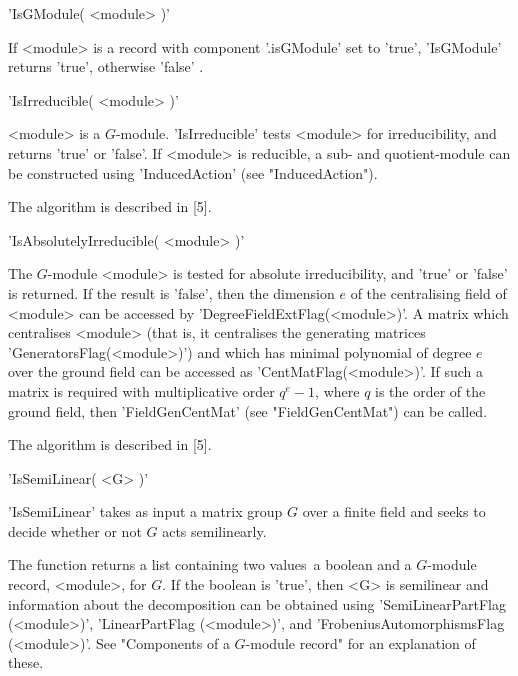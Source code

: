 
'IsGModule( <module> )'

If <module> is  a   record with  component  '.isGModule' set   to 'true',
'IsGModule' returns 'true', otherwise 'false' .



'IsIrreducible( <module> )'

<module>    is   a   $G$-module.   'IsIrreducible'     tests <module> for
irreducibility, and returns 'true' or 'false'.  If <module> is reducible,
a sub- and quotient-module can be  constructed using 'InducedAction' (see
"InducedAction").

The algorithm is described in [5].


'IsAbsolutelyIrreducible( <module> )'

The $G$-module <module> is tested for absolute irreducibility, and 'true'
or 'false' is returned. If the result is  'false', then the dimension $e$
of     the  centralising  field   of  <module>    can    be   accessed by
'DegreeFieldExtFlag(<module>)'.    A  matrix which  centralises  <module>
(that       is,     it       centralises      the     generating matrices
'GeneratorsFlag(<module>)')  and  which has minimal polynomial  of degree
$e$ over the ground field can be accessed as 'CentMatFlag(<module>)'.  If
such a matrix is required with multiplicative order $q^e-1$, where $q$ is
the order     of   the  ground    field,  then    'FieldGenCentMat'  (see
"FieldGenCentMat") can be called.

The algorithm is described in [5].


'IsSemiLinear( <G> )' 

'IsSemiLinear' takes as input a matrix group $G$  over a finite field and
seeks to decide whether or not $G$ acts semilinearly.

The  function  returns a list containing  two  values\:\ a boolean  and a
$G$-module record, <module>, for $G$.  If the boolean is 'true', then <G>
is semilinear  and information  about  the decomposition can  be obtained
using 'SemiLinearPartFlag (<module>)', 'LinearPartFlag (<module>)',   and
'FrobeniusAutomorphismsFlag (<module>)'.   See "Components  of a
$G$-module record" for an explanation of these.

